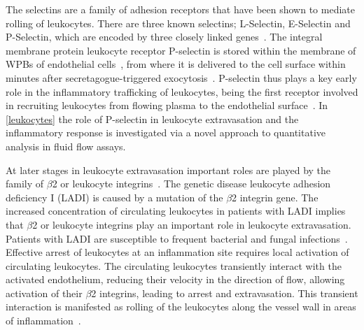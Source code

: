 The selectins are a family of adhesion receptors that have been shown to mediate rolling of leukocytes. There are three known selectins; L-Selectin, E-Selectin and P-Selectin, which are encoded by three closely linked genes~\cite{Watson1990}. The integral membrane protein leukocyte receptor P-selectin is stored within the membrane of WPBs of endothelial cells~\cite{Bonfanti1989, McEver1989}, from where it is delivered to the cell surface within minutes after secretagogue-triggered exocytosis~\cite{McEver2002}. P-selectin thus plays a key early role in the inflammatory trafficking of leukocytes, being the first receptor involved in recruiting leukocytes from flowing plasma to the endothelial surface~\cite{Larsen1989}. In \autoref{leukocytes} the role of P-selectin in leukocyte extravasation and the inflammatory response is investigated via a novel approach to quantitative analysis in fluid flow assays.

At later stages in leukocyte extravasation important roles are played by the family of $\beta$2 or leukocyte integrins~\cite{Springer1990, Mayadas1993}. The genetic disease leukocyte adhesion deficiency I (LADI) is caused by a mutation of the $\beta$2 integrin gene. The increased concentration of circulating leukocytes in patients with LADI implies that $\beta$2 or leukocyte integrins play an important role in leukocyte extravasation. Patients with LADI are susceptible to frequent bacterial and fungal infections~\cite{Anderson1987}. Effective arrest of leukocytes at an inflammation site requires local activation of circulating leukocytes. The circulating leukocytes transiently interact with the activated endothelium, reducing their velocity in the direction of flow, allowing activation of their $\beta$2 integrins, leading to arrest and extravasation. This transient interaction is manifested as rolling of the leukocytes along the vessel wall in areas of inflammation~\cite{Mayadas1993, Atherton1972}.

